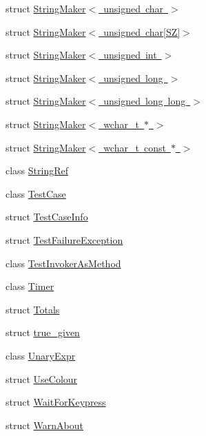 \begin{DoxyCompactItemize}
struct \mbox{\hyperlink{struct_catch_1_1_string_maker_3_01unsigned_01char_01_4}{String\+Maker$<$ unsigned char $>$}}
\item 
struct \mbox{\hyperlink{struct_catch_1_1_string_maker_3_01unsigned_01char[_s_z]_4}{String\+Maker$<$ unsigned char\mbox{[}\+S\+Z\mbox{]}$>$}}
\item 
struct \mbox{\hyperlink{struct_catch_1_1_string_maker_3_01unsigned_01int_01_4}{String\+Maker$<$ unsigned int $>$}}
\item 
struct \mbox{\hyperlink{struct_catch_1_1_string_maker_3_01unsigned_01long_01_4}{String\+Maker$<$ unsigned long $>$}}
\item 
struct \mbox{\hyperlink{struct_catch_1_1_string_maker_3_01unsigned_01long_01long_01_4}{String\+Maker$<$ unsigned long long $>$}}
\item 
struct \mbox{\hyperlink{struct_catch_1_1_string_maker_3_01wchar__t_01_5_01_4}{String\+Maker$<$ wchar\+\_\+t $\ast$ $>$}}
\item 
struct \mbox{\hyperlink{struct_catch_1_1_string_maker_3_01wchar__t_01const_01_5_01_4}{String\+Maker$<$ wchar\+\_\+t const $\ast$ $>$}}
\item 
class \mbox{\hyperlink{class_catch_1_1_string_ref}{String\+Ref}}
\item 
class \mbox{\hyperlink{class_catch_1_1_test_case}{Test\+Case}}
\item 
struct \mbox{\hyperlink{struct_catch_1_1_test_case_info}{Test\+Case\+Info}}
\item 
struct \mbox{\hyperlink{struct_catch_1_1_test_failure_exception}{Test\+Failure\+Exception}}
\item 
class \mbox{\hyperlink{class_catch_1_1_test_invoker_as_method}{Test\+Invoker\+As\+Method}}
\item 
class \mbox{\hyperlink{class_catch_1_1_timer}{Timer}}
\item 
struct \mbox{\hyperlink{struct_catch_1_1_totals}{Totals}}
\item 
struct \mbox{\hyperlink{struct_catch_1_1true__given}{true\+\_\+given}}
\item 
class \mbox{\hyperlink{class_catch_1_1_unary_expr}{Unary\+Expr}}
\item 
struct \mbox{\hyperlink{struct_catch_1_1_use_colour}{Use\+Colour}}
\item 
struct \mbox{\hyperlink{struct_catch_1_1_wait_for_keypress}{Wait\+For\+Keypress}}
\item 
struct \mbox{\hyperlink{struct_catch_1_1_warn_about}{Warn\+About}}
\end{DoxyCompactItemize}
